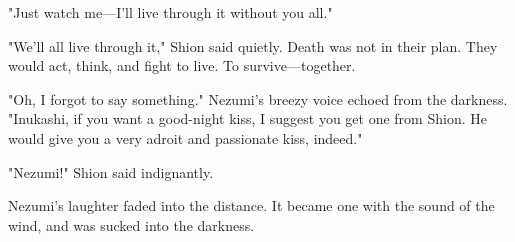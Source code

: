 "Just watch me---I'll live through it without you all."

"We'll all live through it," Shion said quietly. Death was not in their
plan. They would act, think, and fight to live. To survive---together.

"Oh, I forgot to say something." Nezumi's breezy voice echoed from the
darkness. "Inukashi, if you want a good-night kiss, I suggest you get
one from Shion. He would give you a very adroit and passionate kiss,
indeed."

"Nezumi!" Shion said indignantly.

Nezumi's laughter faded into the distance. It became one with the sound
of the wind, and was sucked into the darkness.